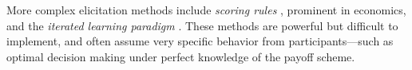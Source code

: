 \documentclass[10pt,letterpaper]{article}
\newcommand{\citep}[1]{\cite{#1}}
\begin{document}
More complex elicitation methods include \emph{scoring rules}
\citep{Savage1971:Elicitation-of-,AndersenFountain2014:Estimating-Subj,SchlagTremewan2014:A-penny-for-you},
prominent in economics, and the \emph{iterated learning paradigm}
\citep{LewandowskyGriffiths2009:The-Wisdom-of-I}.  These methods are powerful but difficult to
implement, and often assume very specific behavior from participants---such as optimal decision
making under perfect knowledge of the payoff scheme.
%
\end{document}
